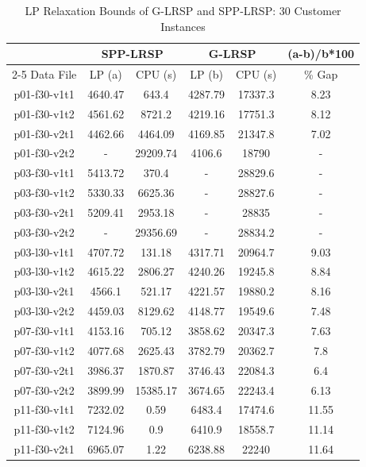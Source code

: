 \begin{table}[h]%
\centering
\caption{LP Relaxation Bounds of G-LRSP and SPP-LRSP: 30 Customer Instances}\label{comparesp-eb-gr2}
\begin {tabular}[h]{|c|c|c|c|c|c|}\hline
\mbox{} &  \multicolumn{2}{|c|}{SPP-LRSP} & \multicolumn{2}{|c|}{ G-LRSP} & (a-b)/b*100 \\\cline{2-5}
 Data File  & LP (a)    & CPU (s) & LP  (b) &  CPU (s) & \% Gap \\\hline
p01-f30-v1t1 &  4640.47 & 643.4     &   4287.79 &  17337.3  & 8.23    \\
p01-f30-v1t2 &  4561.62 & 8721.2    &   4219.16 &  17751.3  & 8.12    \\
p01-f30-v2t1 &  4462.66 & 4464.09   &   4169.85 &  21347.8  & 7.02    \\
p01-f30-v2t2 &  \mbox{-}& 29209.74  &   4106.6  &  18790    & \mbox{-} \\\hline
p03-f30-v1t1 &  5413.72 & 370.4     &   \mbox{-} & 28829.6  & \mbox{-} \\
p03-f30-v1t2 &  5330.33 & 6625.36   &   \mbox{-} & 28827.6  & \mbox{-} \\
p03-f30-v2t1 &  5209.41 & 2953.18   &   \mbox{-} & 28835    & \mbox{-} \\
p03-f30-v2t2 &  \mbox{-} & 29356.69 &   \mbox{-} & 28834.2  & \mbox{-} \\\hline
p03-l30-v1t1 &  4707.72 & 131.18    &   4317.71 &  20964.7  & 9.03  \\
p03-l30-v1t2 &  4615.22 & 2806.27   &   4240.26 &  19245.8  & 8.84  \\
p03-l30-v2t1 &  4566.1  & 521.17    &   4221.57 &  19880.2  & 8.16  \\
p03-l30-v2t2 &  4459.03 & 8129.62   &   4148.77 &  19549.6  & 7.48  \\\hline
p07-f30-v1t1 &  4153.16 & 705.12    &   3858.62 &  20347.3  & 7.63  \\
p07-f30-v1t2 &  4077.68 & 2625.43   &   3782.79 &  20362.7  & 7.8   \\
p07-f30-v2t1 &  3986.37 & 1870.87   &   3746.43 &  22084.3  & 6.4   \\
p07-f30-v2t2 &  3899.99 & 15385.17  &   3674.65 &  22243.4  & 6.13  \\\hline
p11-f30-v1t1 &  7232.02 & 0.59      &   6483.4  &  17474.6  & 11.55 \\
p11-f30-v1t2 &  7124.96 & 0.9       &   6410.9  &  18558.7  & 11.14 \\
p11-f30-v2t1 &  6965.07 & 1.22      &   6238.88 &  22240    & 11.64 \\

\end{tabular}
\end{table}
